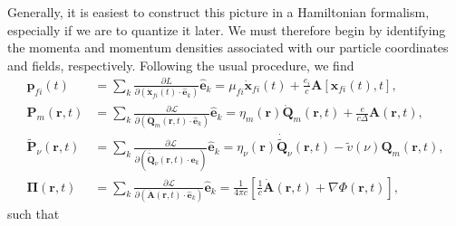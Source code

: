 \documentclass{article}
\begin{document}
Generally, it is easiest to construct this picture in a Hamiltonian formalism, especially if we are to quantize it later. We must therefore begin by identifying the momenta and momentum densities associated with our particle coordinates and fields, respectively. Following the usual procedure, we find
\begin{equation}
\begin{split}
\mathbf{p}_{fi}(t) &= \sum_k\frac{\partial L}{\partial\left(\dot{\mathbf{x}}_{fi}(t)\cdot\hat{\mathbf{e}}_k\right)}\hat{\mathbf{e}}_k = \mu_{fi}\dot{\mathbf{x}}_{fi}(t) + \frac{e_i}{c}\mathbf{A}[\mathbf{x}_{fi}(t),t],\\
\mathbf{P}_m(\mathbf{r},t) &= \sum_k\frac{\partial\mathcal{L}}{\partial\left(\dot{\mathbf{Q}}_m(\mathbf{r},t)\cdot\hat{\mathbf{e}}_k\right)}\hat{\mathbf{e}}_k = \eta_m(\mathbf{r})\dot{\mathbf{Q}}_m(\mathbf{r},t) + \frac{e}{c\Delta}\mathbf{A}(\mathbf{r},t),\\
\tilde{\mathbf{P}}_\nu(\mathbf{r},t) &= \sum_k\frac{\partial\mathcal{L}}{\partial\left(\dot{\tilde{\mathbf{Q}}}_\nu(\mathbf{r},t)\cdot\hat{\mathbf{e}}_k\right)}\hat{\mathbf{e}}_k = \eta_\nu(\mathbf{r})\dot{\tilde{\mathbf{Q}}}_\nu(\mathbf{r},t) - \tilde{v}(\nu)\mathbf{Q}_m(\mathbf{r},t),\\
\mathbf{\Pi}(\mathbf{r},t) &= \sum_k\frac{\partial\mathcal{L}}{\partial\left(\dot{\mathbf{A}}(\mathbf{r},t)\cdot\hat{\mathbf{e}}_k\right)}\hat{\mathbf{e}}_k = \frac{1}{4\pi c}\left[\frac{1}{c}\dot{\mathbf{A}}(\mathbf{r},t) + \nabla\Phi(\mathbf{r},t)\right],
\end{split}
\end{equation}
such that
\end{document}
